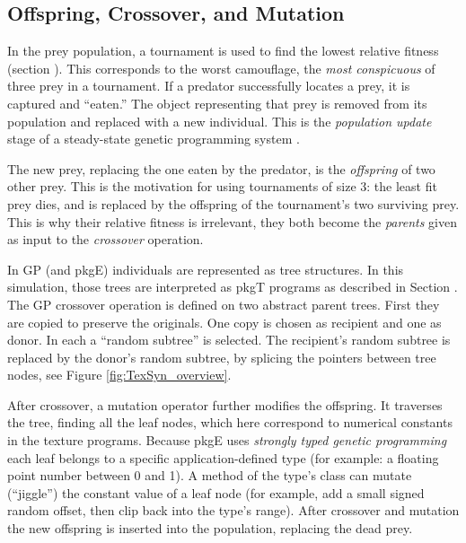 \documentclass[letterpaper]{article}
\newcommand{\jargon}[1]{\textit{#1}}
\newcommand{\texsyn}[0]{pkgT}
\newcommand{\lazypredator}[0]{pkgE}
\begin{document}

\subsection{Offspring, Crossover, and Mutation}
In the prey population, a tournament is used to find the lowest relative fitness (section ). This corresponds to the worst camouflage, the \jargon{most conspicuous} of three prey in a tournament. If a predator successfully locates a prey, it is captured and “eaten.” The object representing that prey is removed from its population and replaced with a new individual. This is the \jargon{population update} stage of a steady-state genetic programming system \cite{syswerda_study_1991}.
\par
The new prey, replacing the one eaten by the predator, is the \jargon{offspring} of two other prey. This is the motivation for using tournaments of size 3: the least fit prey dies, and is replaced by the offspring of the tournament's two surviving prey. This is why their relative fitness is irrelevant, they both become the \jargon{parents} given as input to the \jargon{crossover} operation.
\par
In GP (and \lazypredator{}) individuals are represented as tree structures. In this simulation, those trees are interpreted as \texsyn{} programs as described in Section . The GP crossover operation is defined on two abstract parent trees. First they are copied to preserve the originals. One copy is chosen as recipient and one as donor. In each a “random subtree” is selected. The recipient's random subtree is replaced by the donor's random subtree, by splicing the pointers between tree nodes, see Figure \ref{fig:TexSyn_overview}.
\par
After crossover, a mutation operator further modifies the offspring. It traverses the tree, finding all the leaf nodes, which here correspond to numerical constants in the texture programs. Because \lazypredator{} uses \jargon{strongly typed genetic programming} \cite{montana_strongly_1995} each leaf belongs to a specific application-defined type (for example: a floating point number between 0 and 1). A method of the type's class can mutate (“jiggle”) the constant value of a leaf node (for example, add a small signed random offset, then clip back into the type's range). After crossover and mutation the new offspring is inserted into the population, replacing the dead prey.
\par
\end{document}
